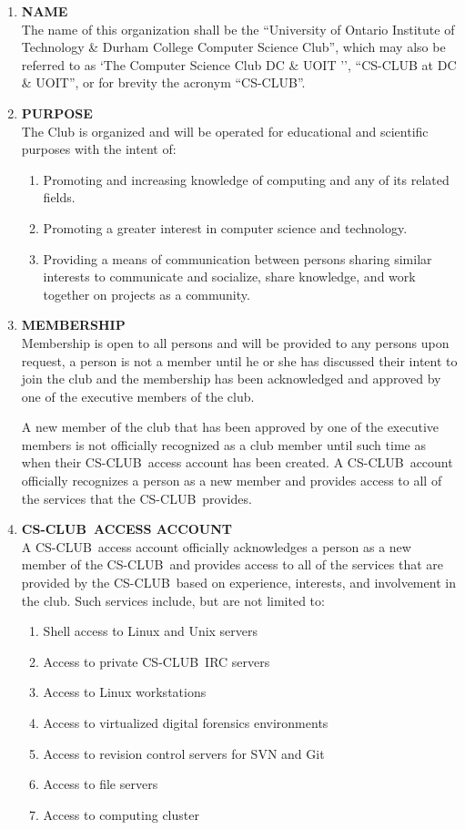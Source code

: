 \documentclass{article}
\providecommand{\csclub}{{\scshape CS-CLUB~}}
\begin{document}
\begin{enumerate}
\item{\bf NAME}\\[0.6em]
The name of this organization shall be the ``University of Ontario Institute of Technology \& Durham College Computer Science Club'', which may also be referred to as `The Computer Science Club DC \& UOIT '', ``CS-CLUB at DC \& UOIT'', or for brevity the acronym ``CS-CLUB''.


\item{\bf PURPOSE}\\[0.6em]
The Club is organized and will be operated for educational and scientific purposes with
	the intent of:
	\begin{enumerate}
	\item Promoting and increasing knowledge of computing and any of its related fields.
	\item Promoting a greater interest in computer science and technology.
	\item Providing a means of communication between persons sharing similar interests to communicate and socialize, share knowledge, and work together on projects as a community.
	\end{enumerate}


\item{\bf MEMBERSHIP}\\[0.6em]
	Membership is open to all persons and will be provided to any persons upon request, a person is not a member until he or she has discussed their intent to join the club and the membership has been acknowledged and approved by one of the executive members of the club.
	
A new member of the club that has been approved by one of the executive members is not officially recognized as a club member until such time as when their \csclub access account has been created. A \csclub account officially recognizes a person as a new member and provides access to all of the services that the \csclub provides.


\item{\bf \csclub ACCESS ACCOUNT}\\[0.6em]
A \csclub access account officially acknowledges a person as a new member of the \csclub and provides access to all of the services that are provided by the \csclub based on experience, interests, and involvement in the club. Such services include, but are not limited to:

	\begin{enumerate}
		\item Shell access to Linux and Unix servers
		\item Access to private \csclub IRC servers
		\item Access to Linux workstations
		\item Access to virtualized digital forensics environments
		\item Access to revision control servers for SVN and Git
		\item Access to file servers
		\item Access to computing cluster
	\end{enumerate}



\end{enumerate}
\end{document}
